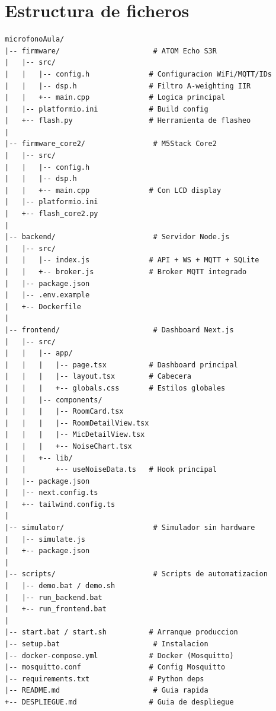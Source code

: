 \documentclass[12pt,a4paper]{report}
\begin{document}
\chapter{Estructura de ficheros}

\begin{lstlisting}[caption={\'Arbol completo del proyecto}, basicstyle=\ttfamily\scriptsize]
microfonoAula/
|-- firmware/                      # ATOM Echo S3R
|   |-- src/
|   |   |-- config.h              # Configuracion WiFi/MQTT/IDs
|   |   |-- dsp.h                 # Filtro A-weighting IIR
|   |   +-- main.cpp              # Logica principal
|   |-- platformio.ini            # Build config
|   +-- flash.py                  # Herramienta de flasheo
|
|-- firmware_core2/                # M5Stack Core2
|   |-- src/
|   |   |-- config.h
|   |   |-- dsp.h
|   |   +-- main.cpp              # Con LCD display
|   |-- platformio.ini
|   +-- flash_core2.py
|
|-- backend/                       # Servidor Node.js
|   |-- src/
|   |   |-- index.js              # API + WS + MQTT + SQLite
|   |   +-- broker.js             # Broker MQTT integrado
|   |-- package.json
|   |-- .env.example
|   +-- Dockerfile
|
|-- frontend/                      # Dashboard Next.js
|   |-- src/
|   |   |-- app/
|   |   |   |-- page.tsx          # Dashboard principal
|   |   |   |-- layout.tsx        # Cabecera
|   |   |   +-- globals.css       # Estilos globales
|   |   |-- components/
|   |   |   |-- RoomCard.tsx
|   |   |   |-- RoomDetailView.tsx
|   |   |   |-- MicDetailView.tsx
|   |   |   +-- NoiseChart.tsx
|   |   +-- lib/
|   |       +-- useNoiseData.ts   # Hook principal
|   |-- package.json
|   |-- next.config.ts
|   +-- tailwind.config.ts
|
|-- simulator/                     # Simulador sin hardware
|   |-- simulate.js
|   +-- package.json
|
|-- scripts/                       # Scripts de automatizacion
|   |-- demo.bat / demo.sh
|   |-- run_backend.bat
|   +-- run_frontend.bat
|
|-- start.bat / start.sh          # Arranque produccion
|-- setup.bat                      # Instalacion
|-- docker-compose.yml            # Docker (Mosquitto)
|-- mosquitto.conf                # Config Mosquitto
|-- requirements.txt              # Python deps
|-- README.md                      # Guia rapida
+-- DESPLIEGUE.md                 # Guia de despliegue
\end{lstlisting}

\end{document}

